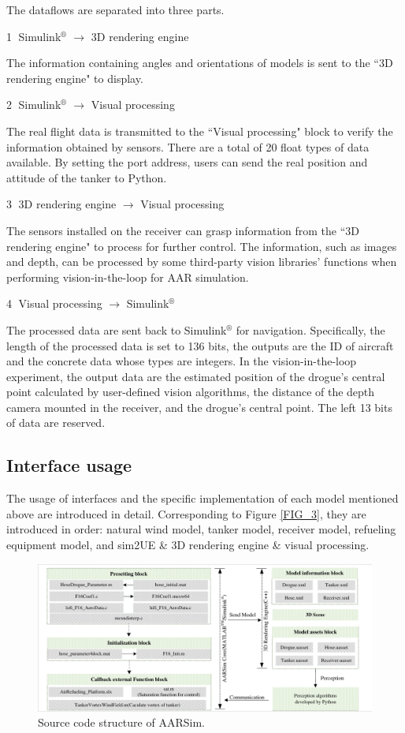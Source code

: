 The dataflows are separated into three parts.

\textcircled{1} Simulink$^\circledR$ $\longrightarrow$ 3D rendering engine

The information containing angles and orientations of models is sent to the ``3D rendering engine" to display.

\textcircled{2} Simulink$^\circledR$  $\longrightarrow$ Visual processing 

The real flight data is transmitted to the ``Visual processing" block to verify the information obtained by sensors. There are a total of 20 float types of data available. By setting the port address, users can send the real position and attitude of the tanker to Python.

\textcircled{3} 3D rendering engine $\longrightarrow$  Visual processing 

The sensors installed on the receiver can grasp information from the ``3D rendering engine" to process for further control. The information, such as images and depth, can be processed by some third-party vision libraries' functions when performing vision-in-the-loop for AAR simulation. 

\textcircled{4} Visual processing $\longrightarrow$ Simulink$^\circledR$

The processed data are sent back to Simulink$^\circledR$ for navigation. Specifically, the length of the processed data is set to 136 bits, the outputs are the ID of aircraft and the concrete data whose types are integers. In the vision-in-the-loop experiment, the output data are the estimated position of the drogue's central point calculated by user-defined vision algorithms, the distance of the depth camera mounted in the receiver, and the drogue's central point. The left 13 bits of data are reserved. 


\subsection{Interface usage }\label{sec2.3}

The usage of interfaces and the specific implementation of each model mentioned above are introduced in detail. Corresponding to Figure \ref{FIG_3}, they are introduced in order: natural wind model, tanker model, receiver model, refueling equipment model, and sim2UE \& 3D rendering engine \& visual processing.

\begin{figure}[th]
	\centering
	\includegraphics[width=1\textwidth]{Figures/Figs_Ch5/Fig4.pdf}
	\caption{Source code structure of AARSim.}\label{FIG_4}
\end{figure}


